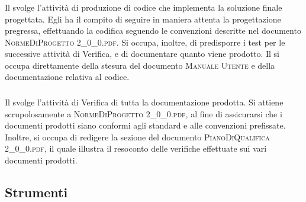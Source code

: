 		\subsubsection{\Progr}
		Il \textit{\Progr} svolge l'attività di produzione di codice che implementa la soluzione finale progettata. Egli ha il compito di seguire in maniera attenta la progettazione pregressa, effettuando la codifica seguendo le convenzioni descritte nel documento \textsc{NormeDiProgetto 2\_0\_0.pdf}. Si occupa, inoltre, di predisporre i test per le successive attività di Verifica, e di documentare quanto viene prodotto.
		Il \textit{\Progr} si occupa direttamente della stesura del documento \textsc{Manuale Utente} e della documentazione relativa al codice.
		
		\subsubsection{\Ver}
		Il \textit{\Ver} svolge l'attività di Verifica di tutta la documentazione prodotta. Si attiene scrupolosamente a \textsc{NormeDiProgetto 2\_0\_0.pdf}, al fine di assicurarsi che i documenti prodotti siano conformi agli standard e alle convenzioni prefissate. Inoltre, si occupa di redigere la sezione del documento \textsc{PianoDiQualifica 2\_0\_0.pdf}, il quale illustra il resoconto delle verifiche effettuate sui vari documenti prodotti.

	\subsection{Strumenti}

